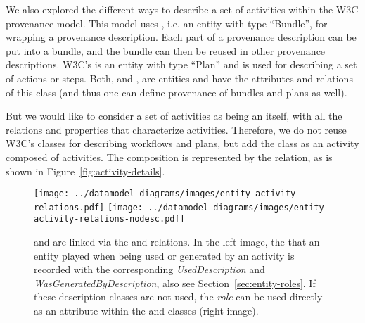 We also explored the different ways to describe a set of activities within the
W3C provenance model. This model uses , i.e. an entity with type
``Bundle'',  for wrapping a provenance description. Each part of a provenance
description can be  put into a bundle, and the bundle can then be reused in
other provenance descriptions.  W3C's  is an entity with type
``Plan'' and is used for describing a  set of actions or steps. Both,
 and , are entities and  have the attributes and
relations of this class (and thus one can define provenance of bundles and plans
as well).

But we would like to consider a set of activities as being an 
itself,  with all the relations and properties that characterize activities.
Therefore, we do not reuse W3C's classes for describing workflows and plans, but
add  the class  as an activity composed of activities. The
composition is represented by  the  relation, as is shown in
Figure~\ref{fig:activity-details}.

%




\begin{figure}[h]
\centering
\texttt{[image: ../datamodel-diagrams/images/entity-activity-relations.pdf]}
\hspace{0.15\textwidth}
\texttt{[image: ../datamodel-diagrams/images/entity-activity-relations-nodesc.pdf]}
\caption[- relations]{ and  are linked via the  and  relations. In the left image, the  that an entity played when being used or generated by an activity is recorded with the corresponding \emph{UsedDescription} and \emph{WasGeneratedByDescription}, also see Section~\ref{sec:entity-roles}. If these description classes are not used, the \emph{role} can be used directly as an attribute within the  and  classes (right image).}
\label{fig:entity-activity-relations}
\end{figure}


